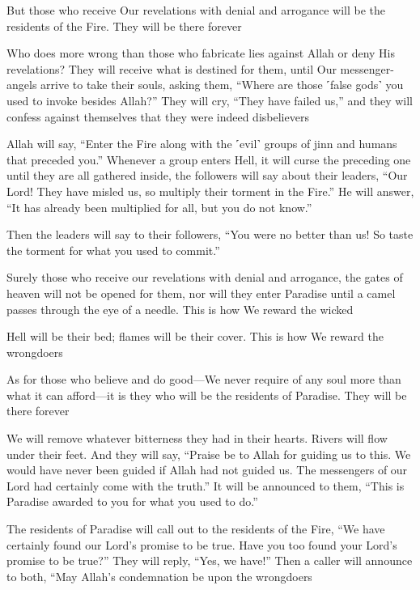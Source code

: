 But those who receive Our revelations with denial and arrogance will be the residents of the Fire. They will be there forever

Who does more wrong than those who fabricate lies against Allah or deny His revelations? They will receive what is destined for them, until Our messenger-angels arrive to take their souls, asking them, “Where are those ˹false gods˺ you used to invoke besides Allah?” They will cry, “They have failed us,” and they will confess against themselves that they were indeed disbelievers

Allah will say, “Enter the Fire along with the ˹evil˺ groups of jinn and humans that preceded you.” Whenever a group enters Hell, it will curse the preceding one until they are all gathered inside, the followers will say about their leaders, “Our Lord! They have misled us, so multiply their torment in the Fire.” He will answer, “It has already been multiplied for all, but you do not know.”

Then the leaders will say to their followers, “You were no better than us! So taste the torment for what you used to commit.”

Surely those who receive our revelations with denial and arrogance, the gates of heaven will not be opened for them, nor will they enter Paradise until a camel passes through the eye of a needle. This is how We reward the wicked

Hell will be their bed; flames will be their cover. This is how We reward the wrongdoers

As for those who believe and do good—We never require of any soul more than what it can afford—it is they who will be the residents of Paradise. They will be there forever

We will remove whatever bitterness they had in their hearts. Rivers will flow under their feet. And they will say, “Praise be to Allah for guiding us to this. We would have never been guided if Allah had not guided us. The messengers of our Lord had certainly come with the truth.” It will be announced to them, “This is Paradise awarded to you for what you used to do.”

The residents of Paradise will call out to the residents of the Fire, “We have certainly found our Lord’s promise to be true. Have you too found your Lord’s promise to be true?” They will reply, “Yes, we have!” Then a caller will announce to both, “May Allah’s condemnation be upon the wrongdoers


